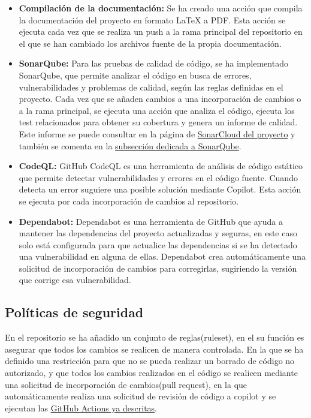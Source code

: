 \begin{itemize}
    \item \textbf{Compilación de la documentación:} Se ha creado una acción que compila la documentación del proyecto en formato LaTeX a PDF. Esta acción se ejecuta cada vez que se realiza un push a la rama principal del repositorio en el que se han cambiado los archivos fuente de la propia documentación.
    \item \textbf{SonarQube:} Para las pruebas de calidad de código, se ha implementado SonarQube, que permite analizar el código en busca de errores, vulnerabilidades y problemas de calidad, según las reglas definidas en el proyecto. Cada vez que se añaden cambios a una incorporación de cambios o a la rama principal, se ejecuta una acción que analiza el código, ejecuta los test relacionados para obtener su cobertura y genera un informe de calidad. Este informe se puede consultar en la página de \href{https://sonarcloud.io/project/overview?id=CesarRodrigu_GII-24.19-contramedidas-IoT-mediante-reinforcement-learning}{SonarCloud del proyecto} y también se comenta en la \hyperref[subsec:sonarqube]{subsección dedicada a SonarQube}.

    \item \textbf{CodeQL:} GitHub CodeQL es una herramienta de análisis de código estático que permite detectar vulnerabilidades y errores en el código fuente. Cuando detecta un error suguiere una posible solución mediante Copilot. Esta acción se ejecuta por cada incorporación de cambios al repositorio.
    \item \textbf{Dependabot:} Dependabot es una herramienta de GitHub que ayuda a mantener las dependencias del proyecto actualizadas y seguras, en este caso solo está configurada para que actualice las dependencias si se ha detectado una vulnerabilidad en alguna de ellas. Dependabot crea automáticamente una solicitud de incorporación de cambios para corregirlas, sugiriendo la versión que corrige esa vulnerabilidad.
\end{itemize}

\subsection{Políticas de seguridad}
\label{subsec:politicas}

En el repositorio se ha añadido un conjunto de reglas(ruleset), en el su función es asegurar que todos los cambios se realicen de manera controlada. En la que se ha definido una restricción para que no se pueda realizar un borrado de código no autorizado, y que todos los cambios realizados en el código se realicen mediante una solicitud de incorporación de cambios(pull request), en la que automáticamente realiza una solicitud de revisión de código a copilot y se ejecutan las \hyperref[subsec:acciones]{GitHub Actions ya descritas}.

